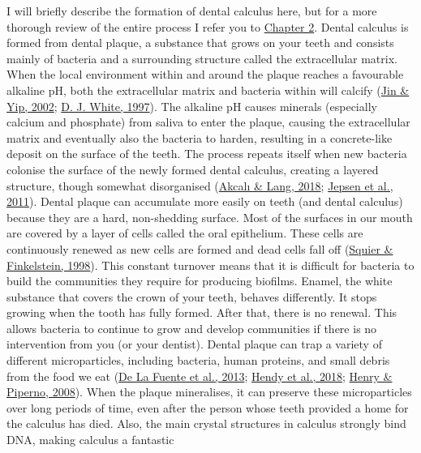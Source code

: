 \documentclass[
  letterpaper,
]{book}
\begin{document}
I will briefly describe the formation of dental calculus here, but for a
more thorough review of the entire process I refer you to
\protect\hyperlink{chap-background}{Chapter 2}. Dental calculus is
formed from dental plaque, a substance that grows on your teeth and
consists mainly of bacteria and a surrounding structure called the
extracellular matrix. When the local environment within and around the
plaque reaches a favourable alkaline pH, both the extracellular matrix
and bacteria within will calcify
(\protect\hyperlink{ref-jinSupragingivalCalculus2002}{Jin \& Yip, 2002};
\protect\hyperlink{ref-whiteDentalCalculus1997}{D. J. White, 1997}). The
alkaline pH causes minerals (especially calcium and phosphate) from
saliva to enter the plaque, causing the extracellular matrix and
eventually also the bacteria to harden, resulting in a concrete-like
deposit on the surface of the teeth. The process repeats itself when new
bacteria colonise the surface of the newly formed dental calculus,
creating a layered structure, though somewhat disorganised
(\protect\hyperlink{ref-akcaliDentalCalculus2018}{Akcalı \& Lang, 2018};
\protect\hyperlink{ref-jepsenCalculusRemoval2011}{Jepsen et al., 2011}).
Dental plaque can accumulate more easily on teeth (and dental calculus)
because they are a hard, non-shedding surface. Most of the surfaces in
our mouth are covered by a layer of cells called the oral epithelium.
These cells are continuously renewed as new cells are formed and dead
cells fall off (\protect\hyperlink{ref-squierOralMucosa1998}{Squier \&
Finkelstein, 1998}). This constant turnover means that it is difficult
for bacteria to build the communities they require for producing
biofilms. Enamel, the white substance that covers the crown of your
teeth, behaves differently. It stops growing when the tooth has fully
formed. After that, there is no renewal. This allows bacteria to
continue to grow and develop communities if there is no intervention
from you (or your dentist). Dental plaque can trap a variety of
different microparticles, including bacteria, human proteins, and small
debris from the food we eat
(\protect\hyperlink{ref-delafuenteDNAHuman2013}{De La Fuente et al.,
2013}; \protect\hyperlink{ref-hendyProteomicCalculus2018}{Hendy et al.,
2018}; \protect\hyperlink{ref-henryCalculusSyria2008}{Henry \& Piperno,
2008}). When the plaque mineralises, it can preserve these
microparticles over long periods of time, even after the person whose
teeth provided a home for the calculus has died. Also, the main crystal
structures in calculus strongly bind DNA, making calculus a fantastic
\end{document}
